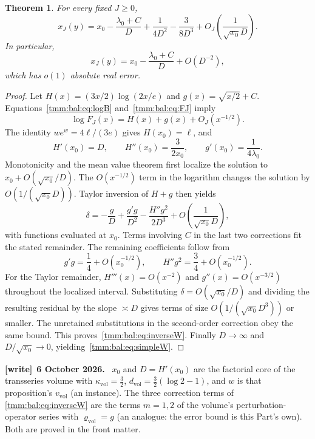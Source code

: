 \documentclass[11pt,letterpaper]{article}
\newtheorem{theorem}{Theorem}[section]
\theoremstyle{remark}\newtheorem{remark}[theorem]{Remark}
\newenvironment{writenote}[1][]{\par\smallskip\begingroup\small
 \noindent\textbf{[write]}\if\relax\detokenize{#1}\relax\else~\textbf{#1.}\fi\ }%
 {\par\endgroup\smallskip}
\newcommand{\vol}{\mathrm{vol}}
\begin{document}
\begin{theorem}\label{tmm:bal:thm:W}
For every fixed $J\ge0$,
\begin{equation}\label{tmm:bal:eq:inverseW}
 x_J(y)=x_0-\frac{\lambda_0+C}{D}
             +\frac1{4D^2}-\frac3{8D^3}
             +O_J\left(\frac1{\sqrt{x_0}D}\right).
\end{equation}
In particular,
\begin{equation}\label{tmm:bal:eq:simpleW}
 x_J(y)=x_0-\frac{\lambda_0+C}{D}+O(D^{-2}),
\end{equation}
which has $o(1)$ absolute real error.
\end{theorem}
\begin{proof}
Let $H(x)=(3x/2)\log(2x/e)$ and $g(x)=\sqrt{x/2}+C$. Equations~\eqref{tmm:bal:eq:logB} and~\eqref{tmm:bal:eq:FJ} imply
\[
 \log F_J(x)=H(x)+g(x)+O_J(x^{-1/2}).
\]
The identity $we^w=4\ell/(3e)$ gives $H(x_0)=\ell$, and
\[
 H'(x_0)=D,\qquad H''(x_0)=\frac3{2x_0},\qquad
 g'(x_0)=\frac1{4\lambda_0}.
\]
Monotonicity and the mean value theorem first localize the solution to $x_0+O(\sqrt{x_0}/D)$. The $O(x^{-1/2})$ term in the logarithm changes the solution by $O(1/(\sqrt{x_0}D))$. Taylor inversion of $H+g$ then yields
\[
 \delta=-\frac gD+\frac{g'g}{D^2}-\frac{H''g^2}{2D^3}
                   +O\left(\frac1{\sqrt{x_0}D}\right),
\]
with functions evaluated at $x_0$. Terms involving $C$ in the last two corrections fit the stated remainder. The remaining coefficients follow from
\[
 g'g=\frac14+O(x_0^{-1/2}),\qquad
 H''g^2=\frac34+O(x_0^{-1/2}).
\]
For the Taylor remainder, $H'''(x)=O(x^{-2})$ and $g''(x)=O(x^{-3/2})$ throughout the localized interval. Substituting $\delta=O(\sqrt{x_0}/D)$ and dividing the resulting residual by the slope $\asymp D$ gives terms of size $O(1/(\sqrt{x_0}D^3))$ or smaller. The unretained substitutions in the second-order correction obey the same bound. This proves~\eqref{tmm:bal:eq:inverseW}. Finally $D\to\infty$ and $D/\sqrt{x_0}\to0$, yielding~\eqref{tmm:bal:eq:simpleW}.
\end{proof}
\begin{writenote}[6 October 2026]
$x_0$ and $D=H'(x_0)$ are the factorial core of the transseries volume \cite{TSvol} with $\kappa_\vol=\frac32$, $d_\vol=\frac32(\log2-1)$, and $w$ is that proposition's $v_\vol$ (an instance). The three correction terms of \eqref{tmm:bal:eq:inverseW} are the terms $m=1,2$ of the volume's perturbation-operator series with $\varrho_\vol=g$ (an analogue: the error bound is this Part's own). Both are proved in the front matter.
\end{writenote}
\end{document}
